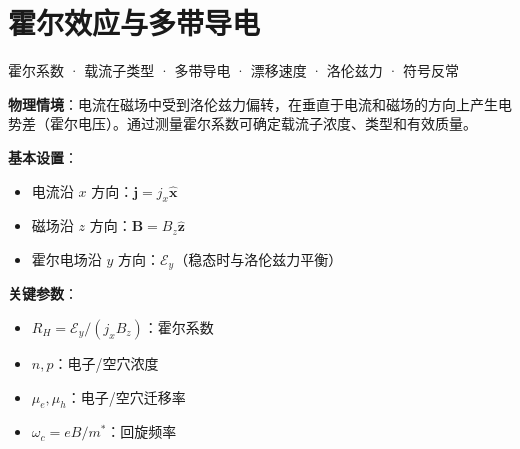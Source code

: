 
\section{霍尔效应与多带导电}
\label{sec:hall-effect}

\begin{tipbox}[关键词标签]
霍尔系数 · 载流子类型 · 多带导电 · 漂移速度 · 洛伦兹力 · 符号反常
\end{tipbox}

\begin{modelbox}[模型：霍尔效应]
\textbf{物理情境}：电流在磁场中受到洛伦兹力偏转，在垂直于电流和磁场的方向上产生电势差（霍尔电压）。通过测量霍尔系数可确定载流子浓度、类型和有效质量。

\textbf{基本设置}：
\begin{itemize}[nosep]
    \item 电流沿 $x$ 方向：$\mathbf{j}=j_x\hat{\mathbf{x}}$
    \item 磁场沿 $z$ 方向：$\mathbf{B}=B_z\hat{\mathbf{z}}$
    \item 霍尔电场沿 $y$ 方向：$\mathcal{E}_y$（稳态时与洛伦兹力平衡）
\end{itemize}

\textbf{关键参数}：
\begin{itemize}[nosep]
    \item $R_H=\mathcal{E}_y/(j_x B_z)$：霍尔系数
    \item $n, p$：电子/空穴浓度
    \item $\mu_e, \mu_h$：电子/空穴迁移率
    \item $\omega_c=eB/m^*$：回旋频率
\end{itemize}
\end{modelbox}

